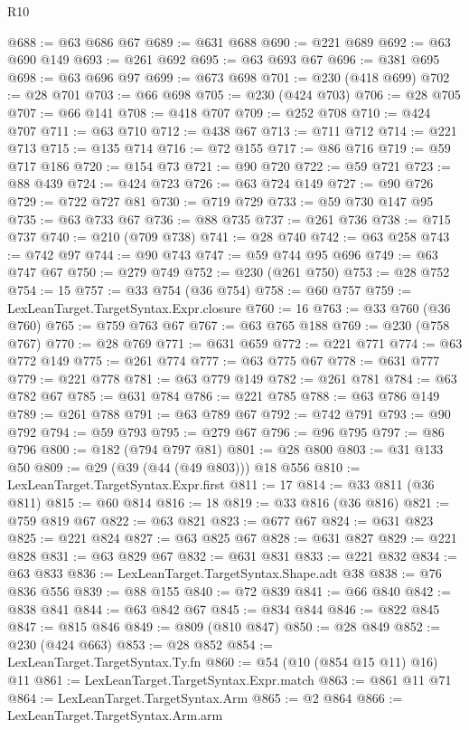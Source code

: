 \begin{lexlean}{R10}
\begin{coremodule}
@688 := @63 @686 @67
@689 := @631 @688
@690 := @221 @689
@692 := @63 @690 @149
@693 := @261 @692
@695 := @63 @693 @67
@696 := @381 @695
@698 := @63 @696 @97
@699 := @673 @698
@701 := @230 (@418 @699)
@702 := @28 @701
@703 := @66 @698
@705 := @230 (@424 @703)
@706 := @28 @705
@707 := @66 @141
@708 := @418 @707
@709 := @252 @708
@710 := @424 @707
@711 := @63 @710
@712 := @438 @67
@713 := @711 @712
@714 := @221 @713
@715 := @135 @714
@716 := @72 @155
@717 := @86 @716
@719 := @59 @717 @186
@720 := @154 @73
@721 := @90 @720
@722 := @59 @721
@723 := @88 @439
@724 := @424 @723
@726 := @63 @724 @149
@727 := @90 @726
@729 := @722 @727 @81
@730 := @719 @729
@733 := @59 @730 @147 @95
@735 := @63 @733 @67
@736 := @88 @735
@737 := @261 @736
@738 := @715 @737
@740 := @210 (@709 @738)
@741 := @28 @740
@742 := @63 @258
@743 := @742 @97
@744 := @90 @743
@747 := @59 @744 @95 @696
@749 := @63 @747 @67
@750 := @279 @749
@752 := @230 (@261 @750)
@753 := @28 @752
@754 := 15
@757 := @33 @754 (@36 @754)
@758 := @60 @757
@759 := LexLeanTarget.TargetSyntax.Expr.closure
@760 := 16
@763 := @33 @760 (@36 @760)
@765 := @759 @763 @67
@767 := @63 @765 @188
@769 := @230 (@758 @767)
@770 := @28 @769
@771 := @631 @659
@772 := @221 @771
@774 := @63 @772 @149
@775 := @261 @774
@777 := @63 @775 @67
@778 := @631 @777
@779 := @221 @778
@781 := @63 @779 @149
@782 := @261 @781
@784 := @63 @782 @67
@785 := @631 @784
@786 := @221 @785
@788 := @63 @786 @149
@789 := @261 @788
@791 := @63 @789 @67
@792 := @742 @791
@793 := @90 @792
@794 := @59 @793
@795 := @279 @67
@796 := @96 @795
@797 := @86 @796
@800 := @182 (@794 @797 @81)
@801 := @28 @800
@803 := @31 @133 @50
@809 := @29 (@39 (@44 (@49 @803))) @18 @556
@810 := LexLeanTarget.TargetSyntax.Expr.first
@811 := 17
@814 := @33 @811 (@36 @811)
@815 := @60 @814
@816 := 18
@819 := @33 @816 (@36 @816)
@821 := @759 @819 @67
@822 := @63 @821
@823 := @677 @67
@824 := @631 @823
@825 := @221 @824
@827 := @63 @825 @67
@828 := @631 @827
@829 := @221 @828
@831 := @63 @829 @67
@832 := @631 @831
@833 := @221 @832
@834 := @63 @833
@836 := LexLeanTarget.TargetSyntax.Shape.adt @38
@838 := @76 @836 @556
@839 := @88 @155
@840 := @72 @839
@841 := @66 @840
@842 := @838 @841
@844 := @63 @842 @67
@845 := @834 @844
@846 := @822 @845
@847 := @815 @846
@849 := @809 (@810 @847)
@850 := @28 @849
@852 := @230 (@424 @663)
@853 := @28 @852
@854 := LexLeanTarget.TargetSyntax.Ty.fn
@860 := @54 (@10 (@854 @15 @11) @16) @11
@861 := LexLeanTarget.TargetSyntax.Expr.match
@863 := @861 @11 @71
@864 := LexLeanTarget.TargetSyntax.Arm
@865 := @2 @864
@866 := LexLeanTarget.TargetSyntax.Arm.arm

\end{coremodule}
\end{lexlean}
